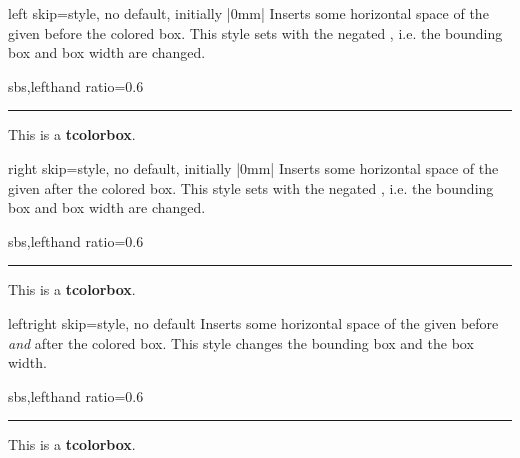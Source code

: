 \clearpage

\begin{docTcbKey}[][doc new=2014-11-07]{left skip}{=}{style, no default, initially |0mm|}
  Inserts some horizontal space of the given  before the colored box.
  This style sets  with the negated ,
  i.e. the bounding box and box width are changed.
\begin{dispExample*}{sbs,lefthand ratio=0.6}
\noindent\rule{\linewidth}{2pt}

\begin{tcolorbox}[left skip=1cm,
    colframe=red!50!white]
  This is a \textbf{tcolorbox}.
\end{tcolorbox}
\end{dispExample*}
\end{docTcbKey}

\begin{docTcbKey}[][doc new=2014-11-07]{right skip}{=}{style, no default, initially |0mm|}
  Inserts some horizontal space of the given  after the colored box.
  This style sets  with the negated ,
  i.e. the bounding box and box width are changed.
\begin{dispExample*}{sbs,lefthand ratio=0.6}
\noindent\rule{\linewidth}{2pt}

\begin{tcolorbox}[right skip=1cm,
    colframe=red!50!white]
  This is a \textbf{tcolorbox}.
\end{tcolorbox}
\end{dispExample*}
\end{docTcbKey}

\begin{docTcbKey}[][doc new=2014-10-10]{leftright skip}{=}{style, no default}
  Inserts some horizontal space of the given  before \emph{and} after the colored box.
  This style changes the bounding box and the box width.
\begin{dispExample*}{sbs,lefthand ratio=0.6}
\noindent\rule{\linewidth}{2pt}

\begin{tcolorbox}[leftright skip=1cm,
    colframe=red!50!white]
  This is a \textbf{tcolorbox}.
\end{tcolorbox}
\end{dispExample*}
\end{docTcbKey}


